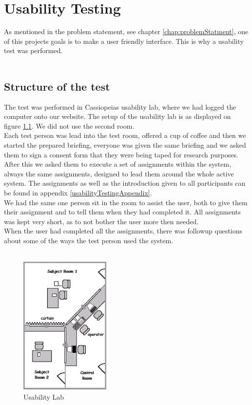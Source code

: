 \chapter{Usability Testing}
\label{chap:usabilityTesting}
As mentioned in the problem statement, see chapter \vref{chap:problemStatment}, one of this projects goals is to make a user friendly interface. This is why a usability test was performed.\\
\\

\section{Structure of the test}
The test was performed in Cassiopeias usability lab, where we had logged the computer onto our website. The setup of the usability lab is as displayed on figure \ref{fig:usabilitylab}. We did not use the second room.\\
Each test person was lead into the test room, offered a cup of coffee and then we started the prepared briefing, everyone was given the same briefing and we asked them to sign a consent form that they were being taped for research purposes.\\
After this we asked them to execute a set of assignments within the system, always the same assignments, designed to lead them around the whole active system. The assignments as well as the introduction given to all participants can be found in appendix \vref{usabilityTestingAppendix}.\\
We had the same one person sit in the room to assist the user, both to give them their assignment and to tell them when they had completed it. All assignments was kept very short, as to not bother the user more then needed.\\
When the user had completed all the assignments, there was followup questions about some of the ways the test person used the system.\\
\\

\begin{figure}[htbp]
	\centering
		\includegraphics[width=0.40\textwidth]{images/usabilitylab.png}
	\caption{Usability Lab}
	\label{fig:usabilitylab}
\end{figure}

